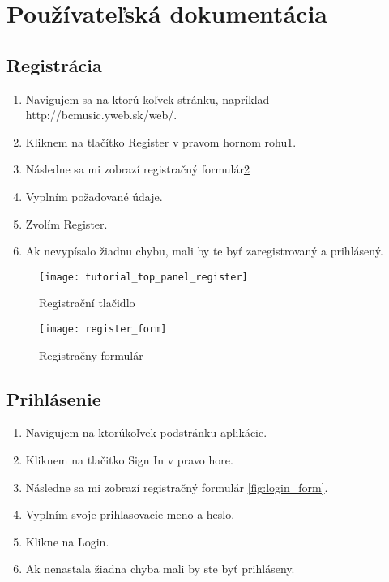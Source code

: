 \newpage
\section{Používateľská dokumentácia}

\subsection{Registrácia}

\begin{enumerate}
\item{Navigujem sa na ktorú koľvek stránku, napríklad http://bcmusic.yweb.sk/web/.}
\item{Kliknem na tlačítko Register v pravom hornom rohu\ref{fig:register_button}.}
\item{Následne sa mi zobrazí registračný formulár\ref{fig:register_form}}
\item{Vyplním požadované údaje.}
\item{Zvolím Register.}
\item{Ak nevypísalo žiadnu chybu, mali by te byť zaregistrovaný a prihlásený.}
\end{enumerate}

\begin{figure}
    \begin{center}
        \texttt{[image: tutorial\_top\_panel\_register]}
        \caption{Registrační tlačidlo}
        \label{fig:register_button}
    \end{center}
\end{figure}

\begin{figure}
    \begin{center}
        \texttt{[image: register\_form]}
        \caption{Registračny formulár}
        \label{fig:register_form}
    \end{center}
\end{figure}

\subsection{Prihlásenie}

\begin{enumerate}
\item{Navigujem na ktorúkoľvek podstránku aplikácie.}
\item{Kliknem na tlačitko Sign In v pravo hore.}
\item{Následne sa mi zobrazí registračný formulár \ref{fig:login_form}.}
\item{Vyplním svoje prihlasovacie meno a heslo.}
\item{Klikne na Login.}
\item{Ak nenastala žiadna chyba mali by ste byť prihláseny.}
\end{enumerate}

